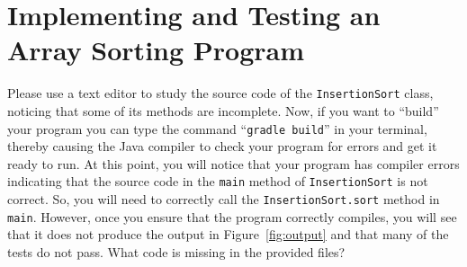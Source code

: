 \documentclass[11pt]{article}
\newcommand{\mainprogram}{\lstinline{InsertionSort}}
\newcommand{\testprogram}{\lstinline{TestInsertionSort}}
\newcommand{\gradlebuild}{\command{gradle build}}
\newcommand{\command}[1]{``\lstinline{#1}''}
\newcommand{\program}[1]{\lstinline{#1}}
\newcommand{\step}[1]{``{#1}''}
\begin{document}
\section*{Implementing and Testing an Array Sorting Program}


Please use a text editor to study the source code of the \mainprogram{} class,
noticing that some of its methods are incomplete. Now, if you want to
\step{build} your program you can type the command \gradlebuild{} in your
terminal, thereby causing the Java compiler to check your program for errors and
get it ready to run. At this point, you will notice that your program has
compiler errors indicating that the source code in the \program{main} method of
\mainprogram{} is not correct. So, you will need to correctly call the
\program{InsertionSort.sort} method in \program{main}. However, once you ensure
that the program correctly compiles, you will see that it does not produce the
output in Figure~\ref{fig:output} and that many of the tests do not pass. What
code is missing in the provided files?
\end{document}

